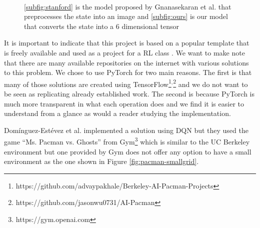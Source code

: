 \documentclass[conference]{IEEEtran}
\begin{document}

\begin{figure}
     \\
    \caption{\ref{subfig:stanford} is the model proposed by Gnanasekaran et al. \cite{stanford2017} that preprocesses the state into an image and \ref{subfig:ours} is our model that converts the state into a 6 dimensional tensor}
    \label{fig:models}
\end{figure}

It is important to indicate that this project is based on a popular template that is freely available and used as a project for a RL class \cite{berkeley_pacman}. We want to make note that there are many available repositories on the internet with various solutions to this problem. We chose to use PyTorch for two main reasons. The first is that many of those solutions are created using TensorFlow\footnote{https://github.com/advaypakhale/Berkeley-AI-Pacman-Projects}$^{,}$\footnote{https://github.com/jasonwu0731/AI-Pacman} and we do not want to be seen as replicating already established work. The second is because PyTorch is much more transparent in what each operation does and we find it is easier to understand from a glance as would a reader studying the implementation.

Dom{\'i}nguez-Est{\'e}vez et al. \cite{DomnguezEstvez2017TrainingPB} implemented a solution using DQN but they used the game ``Ms. Pacman vs. Ghosts'' from Gym\footnote{https://gym.openai.com} which is similar to the UC Berkeley environment but one provided by Gym does not offer any option to have a small environment as the one shown in Figure \ref{fig:pacman-smallgrid}.
\end{document}
